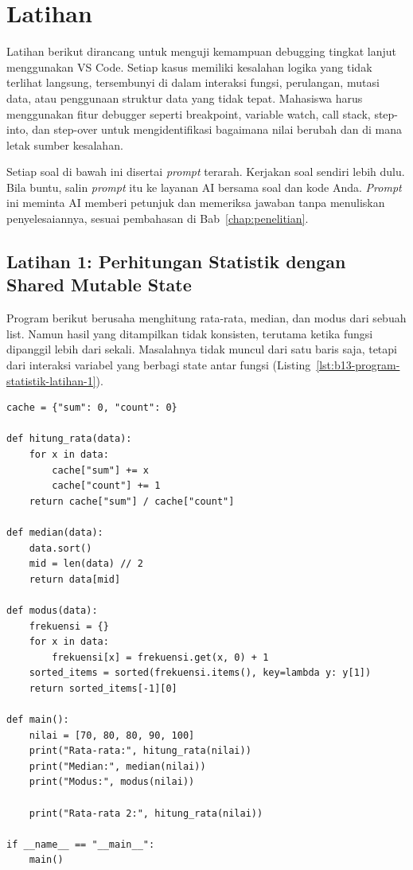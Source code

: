 \section{Latihan}

Latihan berikut dirancang untuk menguji kemampuan debugging tingkat lanjut menggunakan VS Code. Setiap kasus memiliki kesalahan logika yang tidak terlihat langsung, tersembunyi di dalam interaksi fungsi, perulangan, mutasi data, atau penggunaan struktur data yang tidak tepat. Mahasiswa harus menggunakan fitur debugger seperti breakpoint, variable watch, call stack, step-into, dan step-over untuk mengidentifikasi bagaimana nilai berubah dan di mana letak sumber kesalahan.

Setiap soal di bawah ini disertai \textit{prompt} terarah. Kerjakan soal sendiri lebih dulu. Bila buntu, salin \textit{prompt} itu ke layanan AI bersama soal dan kode Anda. \textit{Prompt} ini meminta AI memberi petunjuk dan memeriksa jawaban tanpa menuliskan penyelesaiannya, sesuai pembahasan di Bab~\ref{chap:penelitian}.

\subsection*{Latihan 1: Perhitungan Statistik dengan Shared Mutable State}

Program berikut berusaha menghitung rata-rata, median, dan modus dari sebuah list. Namun hasil yang ditampilkan tidak konsisten, terutama ketika fungsi dipanggil lebih dari sekali. Masalahnya tidak muncul dari satu baris saja, tetapi dari interaksi variabel yang berbagi state antar fungsi (Listing~\ref{lst:b13-program-statistik-latihan-1}).

\begin{lstlisting}[style=PythonStyle, caption={Program statistik untuk Latihan 1}, label={lst:b13-program-statistik-latihan-1}]
cache = {"sum": 0, "count": 0}

def hitung_rata(data):
    for x in data:
        cache["sum"] += x
        cache["count"] += 1
    return cache["sum"] / cache["count"]

def median(data):
    data.sort()     
    mid = len(data) // 2
    return data[mid]

def modus(data):
    frekuensi = {}
    for x in data:
        frekuensi[x] = frekuensi.get(x, 0) + 1
    sorted_items = sorted(frekuensi.items(), key=lambda y: y[1])
    return sorted_items[-1][0]

def main():
    nilai = [70, 80, 80, 90, 100]
    print("Rata-rata:", hitung_rata(nilai))
    print("Median:", median(nilai))
    print("Modus:", modus(nilai))
    
    print("Rata-rata 2:", hitung_rata(nilai))

if __name__ == "__main__":
    main()
\end{lstlisting}

